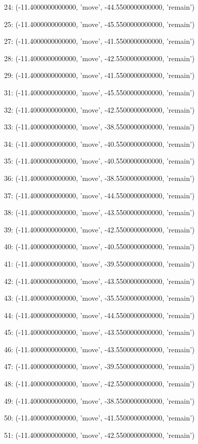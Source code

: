 24: (-11.4000000000000, 'move', -44.5500000000000, 'remain')


25: (-11.4000000000000, 'move', -45.5500000000000, 'remain')


27: (-11.4000000000000, 'move', -41.5500000000000, 'remain')


28: (-11.4000000000000, 'move', -42.5500000000000, 'remain')


29: (-11.4000000000000, 'move', -41.5500000000000, 'remain')


31: (-11.4000000000000, 'move', -45.5500000000000, 'remain')


32: (-11.4000000000000, 'move', -42.5500000000000, 'remain')


33: (-11.4000000000000, 'move', -38.5500000000000, 'remain')


34: (-11.4000000000000, 'move', -40.5500000000000, 'remain')


35: (-11.4000000000000, 'move', -40.5500000000000, 'remain')


36: (-11.4000000000000, 'move', -38.5500000000000, 'remain')


37: (-11.4000000000000, 'move', -44.5500000000000, 'remain')


38: (-11.4000000000000, 'move', -43.5500000000000, 'remain')


39: (-11.4000000000000, 'move', -42.5500000000000, 'remain')


40: (-11.4000000000000, 'move', -40.5500000000000, 'remain')


41: (-11.4000000000000, 'move', -39.5500000000000, 'remain')


42: (-11.4000000000000, 'move', -43.5500000000000, 'remain')


43: (-11.4000000000000, 'move', -35.5500000000000, 'remain')


44: (-11.4000000000000, 'move', -44.5500000000000, 'remain')


45: (-11.4000000000000, 'move', -43.5500000000000, 'remain')


46: (-11.4000000000000, 'move', -43.5500000000000, 'remain')


47: (-11.4000000000000, 'move', -39.5500000000000, 'remain')


48: (-11.4000000000000, 'move', -42.5500000000000, 'remain')


49: (-11.4000000000000, 'move', -38.5500000000000, 'remain')


50: (-11.4000000000000, 'move', -41.5500000000000, 'remain')


51: (-11.4000000000000, 'move', -42.5500000000000, 'remain')



